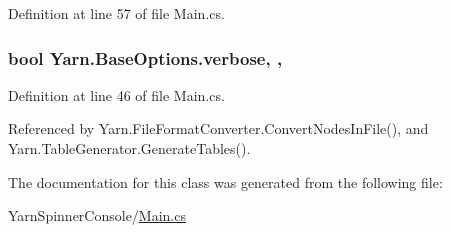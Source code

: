 Definition at line 57 of file Main.\-cs.

\hypertarget{a00041_ada4d83d1756918f362d55f6649b82b17}{
\subsubsection[{verbose}]{\setlength{\rightskip}{0pt plus 5cm}bool Yarn.\-Base\-Options.\-verbose\hspace{0.3cm}{\ttfamily [get]}, {\ttfamily [set]}, {\ttfamily [inherited]}}}\label{a00041_ada4d83d1756918f362d55f6649b82b17}


Definition at line 46 of file Main.\-cs.



Referenced by Yarn.\-File\-Format\-Converter.\-Convert\-Nodes\-In\-File(), and Yarn.\-Table\-Generator.\-Generate\-Tables().



The documentation for this class was generated from the following file\-:\begin{DoxyCompactItemize}
\item 
Yarn\-Spinner\-Console/\hyperlink{a00325}{Main.\-cs}\end{DoxyCompactItemize}

